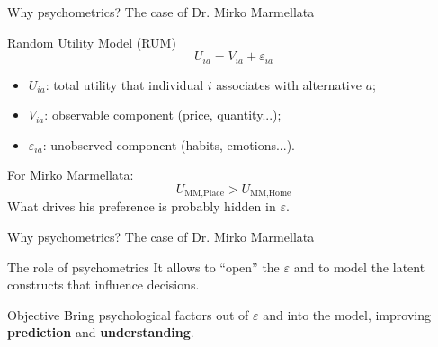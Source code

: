 \documentclass{beamer}
\begin{document}
\begin{frame}{Why psychometrics? The case of Dr. Mirko Marmellata}
\begin{block}{Random Utility Model (RUM)}
\[
U_{ia} = V_{ia} + \varepsilon_{ia}
\]
\begin{itemize}
  \item \(U_{ia}\): total utility that individual \(i\) associates with alternative \(a\);
  \item \(V_{ia}\): observable component (price, quantity...);
  \item \(\varepsilon_{ia}\): unobserved component (habits, emotions...).
\end{itemize}
\end{block}
\vspace{1em}
\begin{block}{For Mirko Marmellata:}
\[
U_{\text{MM}, \text{Place}} > U_{\text{MM}, \text{Home}}
\]
What drives his preference is probably hidden in \(\varepsilon\).
\end{block}
\end{frame}

\begin{frame}{Why psychometrics? The case of Dr. Mirko Marmellata}
\begin{block}{The role of psychometrics}
It allows to ``open'' the \(\varepsilon\) and to model the latent constructs that influence decisions.
\end{block}
\vspace{1em}
\begin{block}{Objective}
Bring psychological factors out of \(\varepsilon\) and into the model, improving \textbf{prediction} and \textbf{understanding}.
\end{block}
\end{frame}
\end{document}
